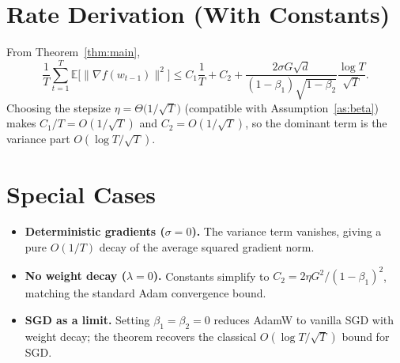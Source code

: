 \documentclass{article}
\newcommand{\E}{\mathbb{E}}
\begin{document}
\section*{Rate Derivation (With Constants)}
From Theorem~\ref{thm:main},
\[
\frac{1}{T}\sum_{t=1}^{T}\E\bigl[\|\nabla f(w_{t-1})\|^{2}\bigr]
\le
C_1\frac{1}{T}+C_2+\frac{2\sigma G\sqrt{d}}{(1-\beta_1)\sqrt{1-\beta_2}}\frac{\log T}{\sqrt{T}}.
\]
Choosing the stepsize $\eta = \Theta\bigl(1/\sqrt{T}\bigr)$ (compatible with Assumption~\ref{as:beta}) makes $C_1/T = O(1/\sqrt{T})$ and $C_2 = O(1/\sqrt{T})$, so the dominant term is the variance part $O(\log T/\sqrt{T})$.

\section*{Special Cases}
\begin{itemize}
\item \textbf{Deterministic gradients ($\sigma=0$).} The variance term vanishes, giving a pure $O(1/T)$ decay of the average squared gradient norm.
\item \textbf{No weight decay ($\lambda=0$).} Constants simplify to $C_2=2\eta G^{2}/(1-\beta_1)^{2}$, matching the standard Adam convergence bound.
\item \textbf{SGD as a limit.} Setting $\beta_1=\beta_2=0$ reduces AdamW to vanilla SGD with weight decay; the theorem recovers the classical $O(\log T/\sqrt{T})$ bound for SGD.
\end{itemize}
\end{document}

